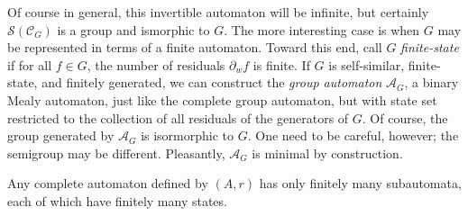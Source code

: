 \documentclass[11pt, titlepage]{article}
\begin{document}
Of course in general,
this invertible automaton will be infinite, but certainly
$\mathcal{S}(\mathcal{C}_G)$ is a group and ismorphic to $G$. The more
interesting case is when $G$ may be represented in terms of a finite
automaton. Toward this end, call $G$ \emph{finite-state} if for all
$f \in G$, the number of residuals $\partial_w f$ is finite. If $G$ is
self-similar, finite-state, and finitely generated, we can construct
the \emph{group automaton} $\mathcal{A}_G$, a binary Mealy automaton,
just like the complete group automaton, but with state set restricted
to the collection of all residuals of the generators of $G$. Of
course, the group generated by $\mathcal{A}_G$ is isormorphic to
$G$. One need to be careful, however; the semigroup may be
different. Pleasantly, $\mathcal{A}_G$ is minimal by construction.

\begin{lemma}
  Any complete automaton defined by $(A, r)$ has only finitely many
  subautomata, each of which have finitely many states.
\end{lemma}
\end{document}
